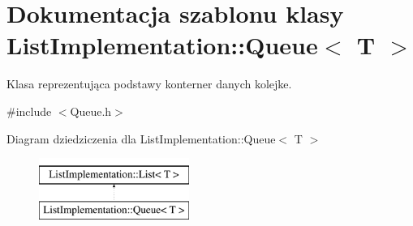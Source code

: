 \hypertarget{class_list_implementation_1_1_queue}{\section{Dokumentacja szablonu klasy List\-Implementation\-:\-:Queue$<$ T $>$}
\label{class_list_implementation_1_1_queue}
}


Klasa reprezentująca podstawy konterner danych kolejke.  




{\ttfamily \#include $<$Queue.\-h$>$}

Diagram dziedziczenia dla List\-Implementation\-:\-:Queue$<$ T $>$\begin{figure}[H]
\begin{center}
\leavevmode
\includegraphics[height=2.000000cm]{class_list_implementation_1_1_queue}
\end{center}
\end{figure}
